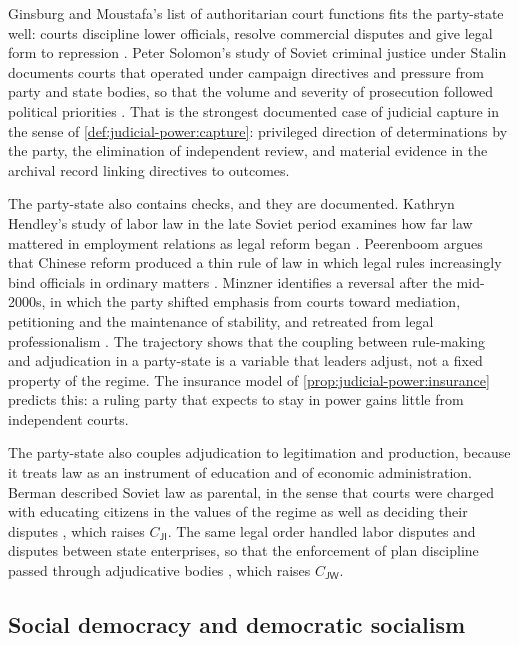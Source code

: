 \documentclass[11pt,letterpaper]{article}
\theoremstyle{definition}
\theoremstyle{remark}
\newcommand{\pJ}{\mathsf{J}}
\newcommand{\pI}{\mathsf{I}}
\newcommand{\pW}{\mathsf{W}}
\begin{document}
Ginsburg and Moustafa's list of authoritarian court functions fits the party-state well: courts discipline lower officials, resolve commercial disputes and give legal form to repression \citep{ginsburg2008}. Peter Solomon's study of Soviet criminal justice under Stalin documents courts that operated under campaign directives and pressure from party and state bodies, so that the volume and severity of prosecution followed political priorities \citep{solomon1996}. That is the strongest documented case of judicial capture in the sense of \cref{def:judicial-power:capture}: privileged direction of determinations by the party, the elimination of independent review, and material evidence in the archival record linking directives to outcomes.

The party-state also contains checks, and they are documented. Kathryn Hendley's study of labor law in the late Soviet period examines how far law mattered in employment relations as legal reform began \citep{hendley1996}. Peerenboom argues that Chinese reform produced a thin rule of law in which legal rules increasingly bind officials in ordinary matters \citep{peerenboom2002}. Minzner identifies a reversal after the mid-2000s, in which the party shifted emphasis from courts toward mediation, petitioning and the maintenance of stability, and retreated from legal professionalism \citep{minzner2011}. The trajectory shows that the coupling between rule-making and adjudication in a party-state is a variable that leaders adjust, not a fixed property of the regime. The insurance model of \cref{prop:judicial-power:insurance} predicts this: a ruling party that expects to stay in power gains little from independent courts.

The party-state also couples adjudication to legitimation and production, because it treats law as an instrument of education and of economic administration. Berman described Soviet law as parental, in the sense that courts were charged with educating citizens in the values of the regime as well as deciding their disputes \citep{berman1963}, which raises $C_{\pJ\pI}$. The same legal order handled labor disputes and disputes between state enterprises, so that the enforcement of plan discipline passed through adjudicative bodies \citep{berman1963,hendley1996}, which raises $C_{\pJ\pW}$.

\subsection{Social democracy and democratic socialism}
\end{document}
